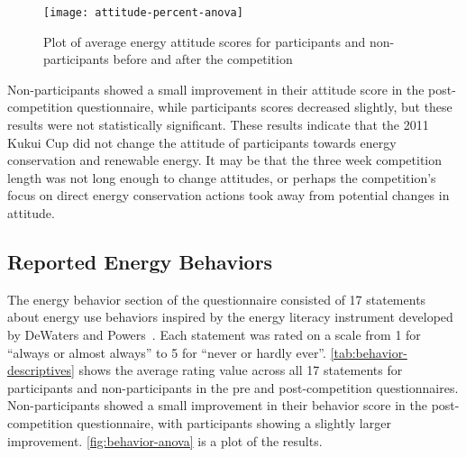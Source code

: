 \begin{figure}[htbp]
	\centering
		\texttt{[image: attitude-percent-anova]}
		\caption[Plot of energy attitudes before and after competition]{Plot of average energy attitude scores for participants and non-participants before and after the competition}
\label{fig:attitude-anova}
\end{figure}

Non-participants showed a small improvement in their attitude score in the post-competition questionnaire, while participants scores decreased slightly, but these results were not statistically significant. These results indicate that the 2011 Kukui Cup did not change the attitude of participants towards energy conservation and renewable energy. It may be that the three week competition length was not long enough to change attitudes, or perhaps the competition's focus on direct energy conservation actions took away from potential changes in attitude.




\subsection{Reported Energy Behaviors}

The energy behavior section of the questionnaire consisted of 17 statements about energy use behaviors inspired by the energy literacy instrument developed by DeWaters and Powers~\cite{DeWaters2011}. Each statement was rated on a scale from 1 for ``always or almost always'' to 5 for ``never or hardly ever''. \autoref{tab:behavior-descriptives} shows the average rating value across all 17 statements for participants and non-participants in the pre and post-competition questionnaires. Non-participants showed a small improvement in their behavior score in the post-competition questionnaire, with participants showing a slightly larger improvement. \autoref{fig:behavior-anova} is a plot of the results.

